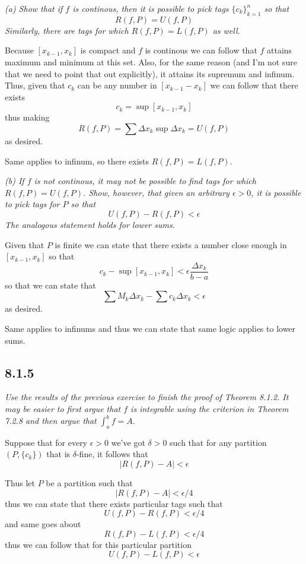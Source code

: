\documentclass[11pt,oneside,titlepage]{book}
\begin{document}
\textit{(a) Show that if $f$ is continous, then it is possible to pick tags
  $\{c_k\}_{k = 1}^n$ so that}
$$R(f, P) = U(f, P)$$
\textit{Similarly, there are tags for which $R(f, P) = L(f, P)$ as well.}

Because $[x_{k - 1}, x_k]$ is compact and $f$ is continous we can follow that
$f$ attains maximum and minimum at this set. Also, for the same reason
(and I'm not sure that we need to point that out explicitly), it attains its
supremum and infinum. Thus, 
given that $c_k$ can be any number in $[x_{k - 1} - x_k]$ we can follow that
there exists
$$c_k = \sup [x_{k - 1}, x_k ]$$
thus making
$$R(f, P) = \sum \Delta x_k \sup \Delta x_k = U(f, P)$$
as desired.

Same applies to infinum, so there exists $R(f, P) = L(f, P)$.

\textit{(b) If $f$ is not continous, it may not be possible to find tags for which
  $R(f, P) = U(f, P)$. Show, however, that given an arbitrary $\epsilon > 0$, it is possible
  to pick tags for $P$ so that }
$$U(f, P) - R(f, P) < \epsilon$$
\textit{The analogous statement holds for lower sums.}

Given that $P$ is finite we can state that there exists a number close enough
in $[x_{k - 1}, x_k]$ so that
$$c_k - \sup [x_{k - 1}, x_k] < \epsilon \frac{\Delta x_k}{b - a}$$
so that we can state that
$$\sum M_k \Delta x_k - \sum c_k \Delta x_k < \epsilon$$
as desired.

Same applies to infinums and thus we can state that same logic
applies to lower sums.

\subsection*{8.1.5}

\textit{Use the results of the previous exercise to finish the proof of
  Theorem 8.1.2. It may be easier to first argue that $f$ is integrable using the
  criterion in Theorem 7.2.8 and then argue that $\int_a^b f = A$.}

Suppose that for every $\epsilon > 0$ we've got $\delta > 0$ such that for any partition
$(P,\{c_k\})$ that is $\delta$-fine, it follows that 
$$|R(f, P) - A| < \epsilon$$

Thus let $P$ be a partition such that
$$|R(f, P) - A| < \epsilon/4$$
thus we can state that there exists particular tags such that 
$$U(f, P) - R(f, P) < \epsilon/4$$
and same goes about
$$R(f, P) - L(f, P) < \epsilon/4$$
thus we can follow that for this particular partition
$$U(f, P) - L(f, P) < \epsilon$$
\end{document}
